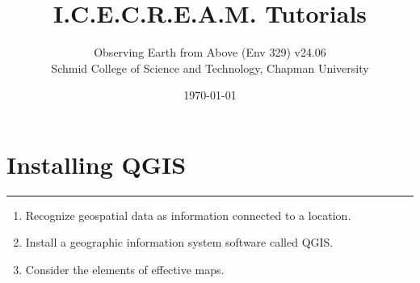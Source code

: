 \documentclass[oneside,a4paper,11pt,explicit]{book}
\title{I.C.E.C.R.E.A.M. Tutorials}
\subtitle{\small Observing Earth from Above (Env 329) v24.06 \\
	\small Schmid College of Science and Technology, Chapman University}
\date{\today}
\begin{document}
\setcounter{tocdepth}{3}
\setcounter{minitocdepth}{3}
\dominitoc
\faketableofcontents

\setcounter{chapter}{0} %

\chapter{Installing QGIS} %

\vspace{-2em}

\minitoc

\hrule

\vspace{1em}

\begin{tcolorbox}[enhanced,frame style image=blueshade.png,
	opacityback=0.75,opacitybacktitle=0.25,
	colback=blue!5!white,colframe=blue!75!black,title={\Large \textbf{Objectives:}}]
	\large
	\begin{enumerate}
		\item Recognize geospatial data as information connected to a location.
        \item Install a geographic information system software called QGIS. 
        \item Consider the elements of effective maps. 
	\end{enumerate}
\end{tcolorbox}

\clearpage
\end{document}

